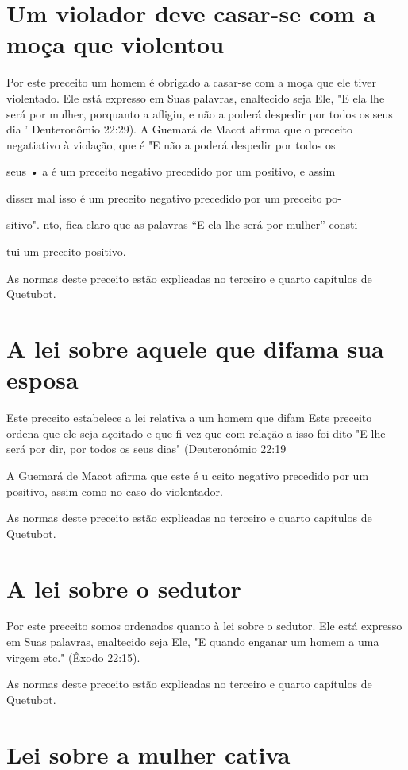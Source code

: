 \section{Um violador deve casar-se com a moça que violentou}

Por este preceito um homem é obrigado a casar-se com a moça que ele
tiver violentado. Ele está expresso em Suas palavras, enaltecido seja
Ele, "E ela lhe será por mulher, porquanto a afligiu, e não a poderá
despedir por todos os seus dia ' Deuteronômio 22:29). A Guemará de Macot
afirma que o precei­to negatiativo à violação, que é "E não a poderá
despedir por todos os

seus • a é um preceito negativo precedido por um positivo, e assim

disser mal isso é um preceito negativo precedido por um preceito po-

sitivo". nto, fica claro que as palavras ``E ela lhe será por mulher''
consti-

tui um preceito positivo.

As normas deste preceito estão explicadas no terceiro e quarto
capí­tulos de Quetubot.

\section{A lei sobre aquele que difama sua esposa}

Este preceito estabelece a lei relativa a um homem que difam Este
preceito ordena que ele seja açoitado e que fi vez que com relação a
isso foi dito "E lhe será por dir, por todos os seus dias" (Deuteronômio
22:19

A Guemará de Macot afirma que este é u ceito negativo precedido
por um positivo, assim como no caso do violentador.

As normas deste preceito estão explicadas no terceiro e quarto
capí­tulos de Quetubot.

\section{A lei sobre o sedutor}

Por este preceito somos ordenados quanto à lei sobre o sedutor. Ele está
expresso em Suas palavras, enaltecido seja Ele, "E quando enganar um
ho­mem a uma virgem etc." (Êxodo 22:15).

As normas deste preceito estão explicadas no terceiro e quarto
capí­tulos de Quetubot.

\section{Lei sobre a mulher cativa}

